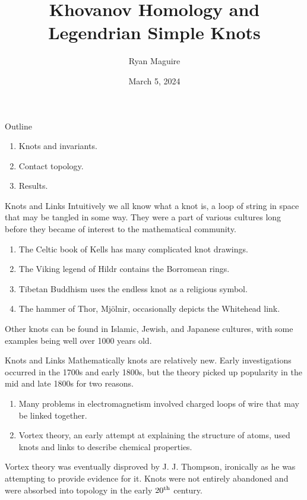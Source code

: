 \documentclass{beamer}
\title{Khovanov Homology and Legendrian Simple Knots}
\author{Ryan Maguire}
\date{March 5, 2024}
\begin{document}
    \maketitle
    \begin{frame}{Outline}
        \begin{enumerate}
            \item Knots and invariants.
            \item Contact topology.
            \item Results.
        \end{enumerate}
    \end{frame}
    \begin{frame}{Knots and Links}
        Intuitively we all know what a knot is, a loop of string in space that
        may be tangled in some way. They were a part
        of various cultures long before they became of interest to the
        mathematical community.
        \begin{enumerate}
            \item The Celtic book of Kells has many complicated knot drawings.
            \item The Viking legend of Hildr contains the Borromean rings.
            \item Tibetan Buddhism uses the endless knot as a religious symbol.
            \item The hammer of Thor, Mj\"{o}lnir, occasionally depicts the Whitehead link.
        \end{enumerate}
        Other knots can be found in Islamic, Jewish, and Japanese cultures,
        with some examples being well over 1000 years old.
    \end{frame}
    \begin{frame}{Knots and Links}
        Mathematically knots are relatively new. Early investigations occurred
        in the 1700s and early 1800s, but the theory picked up popularity in
        the mid and late 1800s for two reasons.
        \begin{enumerate}
            \item
                Many problems in electromagnetism involved charged loops
                of wire that may be linked together.
            \item
                Vortex theory, an early attempt at explaining the structure of
                atoms, used knots and links to describe chemical properties.
        \end{enumerate}
        Vortex theory was eventually disproved by J. J. Thompson, ironically
        as he was attempting to provide evidence for it. Knots were not
        entirely abandoned and were absorbed into topology in the
        early $20^{\small\textrm{th}}$ century.
    \end{frame}
\end{document}
